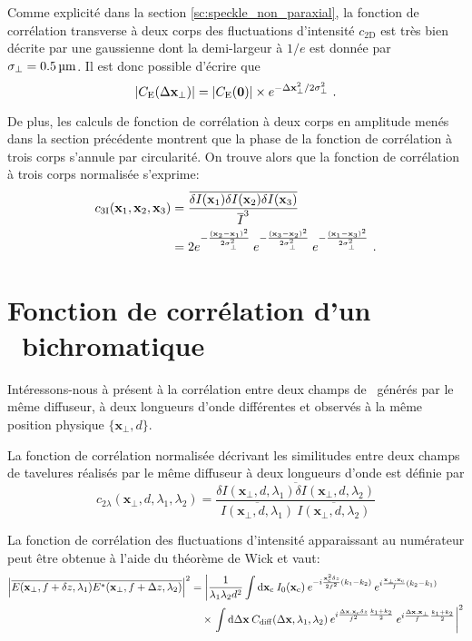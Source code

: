 Comme explicité dans la section \ref{sc:speckle_non_paraxial}, la fonction de corrélation transverse à deux corps des fluctuations d'intensité $c_{\mathrm{2D}}$ est très bien décrite par une gaussienne dont la demi-largeur à $1/e$ est donnée par $\sigma_{\perp}=\SI{0.5}{\micro\metre}$. Il est donc possible d'écrire que
\begin{equation}
\left|C_{\mathrm{E}}(\Delta\mathbf{x}_{\perp})\right|=|C_{\mathrm{E}}(\mathbf{0})| \times e^{-\Delta\mathbf{x}_{\perp}^2/2\sigma_{\perp}^2} \text{ .}
\end{equation}

De plus, les calculs de fonction de corrélation à deux corps en amplitude menés dans la section précédente montrent que la phase de la fonction de corrélation à trois corps s'annule par circularité. On trouve alors que la fonction de corrélation à trois corps normalisée s'exprime:
\begin{align}
c_{\mathrm{3I}}(\mathbf{x}_1,\mathbf{x}_2,\mathbf{x}_3) &= \frac{\overline{\delta I(\mathbf{x}_1) \delta I(\mathbf{x}_2) \delta I(\mathbf{x}_3)}}{\overline{I}^3}\\
&= 2 e^{-\frac{(\mathbf{x}_2-\mathbf{x}_1)^2}{2\sigma_{\perp}^2}} \: e^{-\frac{(\mathbf{x}_3-\mathbf{x}_2)^2}{2\sigma_{\perp}^2}} \: e^{-\frac{(\mathbf{x}_1-\mathbf{x}_3)^2}{2\sigma_{\perp}^2}} \text{ .}
\end{align}

\section{Fonction de corrélation d'un \speckle\ bichromatique}
Intéressons-nous à présent à la corrélation entre deux champs de \speckle\ générés par le même diffuseur, à deux longueurs d'onde différentes et observés à la même position physique $\lbrace \mathbf{x}_{\perp}, d \rbrace$.


La fonction de corrélation normalisée décrivant les similitudes entre deux champs de tavelures réalisés par le même diffuseur à deux longueurs d'onde est définie par
\begin{equation}
c_{2\lambda}(\mathbf{x}_{\perp},d,\lambda_1, \lambda_2)=\frac{\overline{\delta I (\mathbf{x}_{\perp},d,\lambda_1) \delta I (\mathbf{x}_{\perp},d,\lambda_2)}}{\overline{I(\mathbf{x}_{\perp},d,\lambda_1)}\:\overline{I(\mathbf{x}_{\perp},d,\lambda_2)}}
\end{equation}

La fonction de corrélation des fluctuations d'intensité apparaissant au numérateur peut être obtenue à l'aide du théorème de Wick et vaut:
\begin{align}
\left| \overline{E(\mathbf{x}_{\perp},f+\delta z,\lambda_1)E^*(\mathbf{x}_{\perp},f+\Delta z,\lambda_2)} \right|^2 &= \left| \frac{1}{\lambda_1\lambda_2 d^2} \int{\mathop{}\mathopen{}\mathrm{d}\mathbf{x}_{\mathrm{c}}\: I_0(\mathbf{x}_{\mathrm{c}}) \: e^{-i\frac{\mathbf{x}_{\mathrm{c}}^2 \delta z}{2f^2}(k_1-k_2)} \: e^{i \frac{\mathbf{x}_{\perp}.\mathbf{x}_{\mathrm{c}}}{f}(k_2-k_1)}}\right. \\
&\nonumber \quad\times \left. \int{\mathop{}\mathopen{}\mathrm{d}\Delta\mathbf{x}\: C_{\mathrm{diff}}(\Delta\mathbf{x}, \lambda_1, \lambda_2)\: e^{i \frac{\Delta\mathbf{x}.\mathbf{x}_{\mathrm{c}}\delta z}{f^2}\frac{k_1+k_2}{2}} \: e^{i\frac{\Delta\mathbf{x}.\mathbf{x}_{\perp}}{f}\frac{k_1+k_2}{2}}}\right|^2
\end{align}

